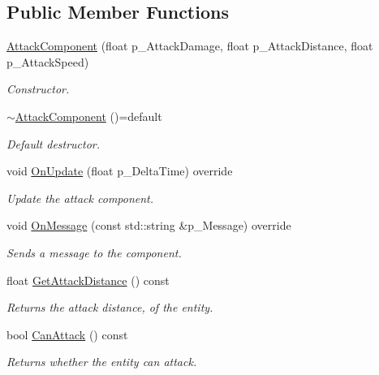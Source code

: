 \subsection*{Public Member Functions}
\begin{DoxyCompactItemize}
\item 
\mbox{\hyperlink{class_attack_component_a3101ccb496d676e22c900a0d13a421ea}{Attack\+Component}} (float p\+\_\+\+Attack\+Damage, float p\+\_\+\+Attack\+Distance, float p\+\_\+\+Attack\+Speed)
\begin{DoxyCompactList}\small\item\em Constructor. \end{DoxyCompactList}\item 
\mbox{\label{class_attack_component_a4a8e4feceb164aaaf8f0d53b76dd6efc}} 
\mbox{\hyperlink{class_attack_component_a4a8e4feceb164aaaf8f0d53b76dd6efc}{$\sim$\+Attack\+Component}} ()=default
\begin{DoxyCompactList}\small\item\em Default destructor. \end{DoxyCompactList}\item 
void \mbox{\hyperlink{class_attack_component_a92aca094d9d41cddca1a730e672cb835}{On\+Update}} (float p\+\_\+\+Delta\+Time) override
\begin{DoxyCompactList}\small\item\em Update the attack component. \end{DoxyCompactList}\item 
void \mbox{\hyperlink{class_attack_component_a25a304233ac871cfec61b6cc744b10bb}{On\+Message}} (const std\+::string \&p\+\_\+\+Message) override
\begin{DoxyCompactList}\small\item\em Sends a message to the component. \end{DoxyCompactList}\item 
\mbox{\label{class_attack_component_a9a71b675729b8570570c4f1105848288}} 
float \mbox{\hyperlink{class_attack_component_a9a71b675729b8570570c4f1105848288}{Get\+Attack\+Distance}} () const
\begin{DoxyCompactList}\small\item\em Returns the attack distance, of the entity. \end{DoxyCompactList}\item 
\mbox{\label{class_attack_component_a65d94be45a6265e0a831755b78b170e5}} 
bool \mbox{\hyperlink{class_attack_component_a65d94be45a6265e0a831755b78b170e5}{Can\+Attack}} () const
\begin{DoxyCompactList}\small\item\em Returns whether the entity can attack. \end{DoxyCompactList}\end{DoxyCompactItemize}


